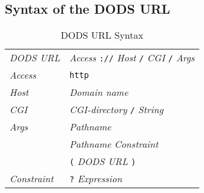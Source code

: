 \subsection{Syntax of the DODS URL}

\begin{table}
\caption{DODS URL Syntax}
\label{url:tab:url}
\begin{center}
\begin{tabular}{ll} \hline
{\em DODS URL\/} & {\em Access\/} {\tt ://} {\em Host\/} {\tt /} {\em CGI\/}
{\tt /} {\em Args\/} \\
{\em Access\/} & {\tt http} \\
{\em Host\/} & {\em Domain name\/} \\
{\em CGI\/} & {\em CGI-directory\/} {\tt /} {\em String\/} \\
{\em Args\/} & {\em Pathname\/} \\
             & {\em Pathname\/} {\em Constraint} \\
             & {\tt (} {\em DODS URL\/} {\tt )} \\
{\em Constraint\/} & {\tt ?} {\em Expression\/} \\
\end{tabular}
\end{center}
\end{table}

